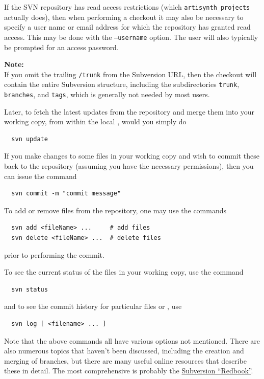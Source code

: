 If the SVN repository has read access restrictions (which 
{\tt artisynth\_projects} actually does), then when performing a
checkout it may also be necessary to specify a user name or email
address for which the repository has granted read access. This may be
done with the {\tt --username} option. The user will also
typically be prompted for an access password.

\begin{sideblock}
{\bf Note:}\\ 
If you omit the trailing {\tt /trunk} from the
Subversion URL, then the checkout will contain the entire Subversion
\directory{} structure, including the subdirectories {\tt trunk}, {\tt
branches}, and {\tt tags}, which is generally not needed by most
users.
\end{sideblock}

Later, to fetch the latest updates from the repository and
merge them into your working copy, from within the local
\directory{}, would you simply do
\begin{verbatim}
  svn update
\end{verbatim}

If you make changes to some files in your working copy and wish to
commit these back to the repository (assuming you have the necessary
permissions), then you can issue the command
\begin{verbatim}
  svn commit -m "commit message"
\end{verbatim}
To add or remove files from the repository, one may use
the commands
\begin{verbatim}
  svn add <fileName> ...     # add files
  svn delete <fileName> ...  # delete files
\end{verbatim}
prior to performing the commit.

To see the current status of the files in your working copy,
use the command
\begin{verbatim}
  svn status
\end{verbatim}
and to see the commit history for particular files or \directories{},
use 
\begin{verbatim}
  svn log [ <filename> ... ]
\end{verbatim}

Note that the above commands all have various options not mentioned.
There are also numerous topics that haven't been discussed, including
the creation and merging of branches, but there are many useful online
resources that describe these in detail. The most comprehensive
is probably the \href{http://svnbook.red-bean.com}{Subversion ``Redbook''}.



